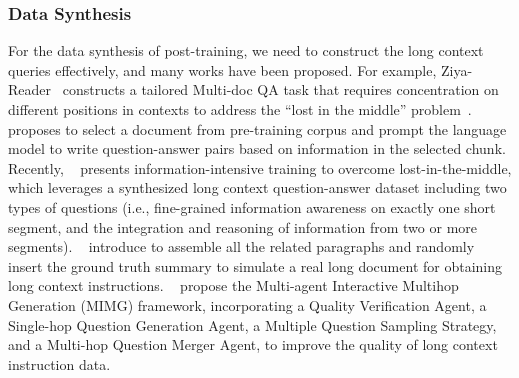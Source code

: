 \documentclass[11pt, a4paper, logo, copyright, nonumbering]{map}
\begin{document}
\subsubsection{Data Synthesis}
For the data synthesis of post-training, 
we need to construct the long context queries effectively,
and many works have been proposed.
For example,
Ziya-Reader~\citep{pamqa} constructs a tailored Multi-doc QA task that requires concentration on different positions in contexts to address the ``lost in the middle'' problem~\citep{liu2024lost}. 
~\citet{xiong-etal-2024-effective} proposes to select a document from pre-training corpus and prompt the language model to write question-answer pairs based on information in the selected chunk.
Recently, ~\citet{an2024make} presents information-intensive training to overcome lost-in-the-middle,
which leverages a synthesized long context question-answer dataset including two types of questions (i.e., fine-grained information awareness on exactly one short segment, and the integration and reasoning of information from two or more segments).
~\citet{Xu2024ChatQA2B} introduce to assemble all the related
paragraphs and randomly insert the ground truth summary to simulate a real long document for obtaining long context instructions.
~\citet{Chen2024WhatAT} propose the
 Multi-agent Interactive Multihop Generation (MIMG) framework, incorporating a Quality Verification Agent,
a Single-hop Question Generation Agent, a Multiple Question Sampling Strategy, and a Multi-hop Question Merger Agent, to improve the quality of long context instruction data.
\end{document}
